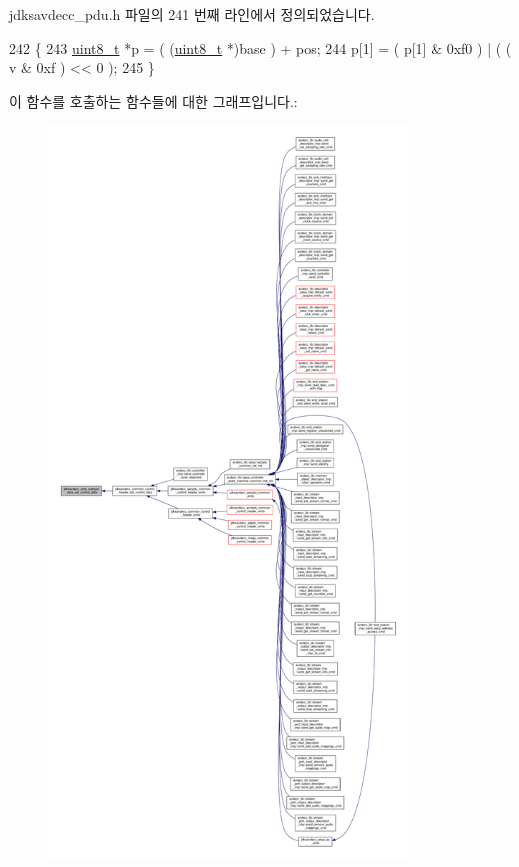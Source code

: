jdksavdecc\+\_\+pdu.\+h 파일의 241 번째 라인에서 정의되었습니다.


\begin{DoxyCode}
242 \{
243     \hyperlink{stdint_8h_aba7bc1797add20fe3efdf37ced1182c5}{uint8\_t} *p = ( (\hyperlink{stdint_8h_aba7bc1797add20fe3efdf37ced1182c5}{uint8\_t} *)base ) + pos;
244     p[1] = ( p[1] & 0xf0 ) | ( ( v & 0xf ) << 0 );
245 \}
\end{DoxyCode}


이 함수를 호출하는 함수들에 대한 그래프입니다.\+:
\nopagebreak
\begin{figure}[H]
\begin{center}
\leavevmode
\includegraphics[height=550pt]{group__jdksavdecc__subtype__data_ga6f67bb7ecf589b67eb0ba7a6e685b008_icgraph}
\end{center}
\end{figure}


